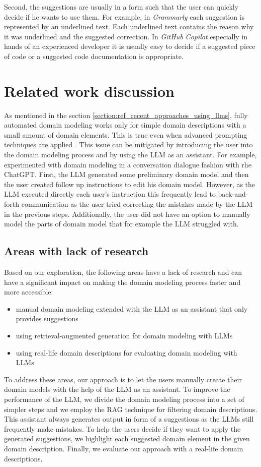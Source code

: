 Second, the suggestions are usually in a form such that the user can quickly decide if he wants to use them. For example, in \textit{Grammarly} each suggestion is represented by an underlined text. Each underlined text contains the reason why it was underlined and the suggested correction. In \textit{GitHub Copilot} especially in hands of an experienced developer it is usually easy to decide if a suggested piece of code or a suggested code documentation is appropriate.


\chapter{Related work discussion}

As mentioned in the section \ref{section:ref_recent_approaches_using_llms}, fully automated domain modeling works only for simple domain descriptions with a small amount of domain elements. This is true even when advanced prompting techniques are applied \cite{Saeedizade2024}. This issue can be mitigated by introducing the user into the domain modeling process \cite{Camara2023} and by using the LLM as an assistant. For example, \citet{Camara2023} experimented with domain modeling in a conversation dialogue fashion with rhe ChatGPT. First, the LLM generated some preliminary domain model and then the user created follow up instructions to edit his domain model. However, as the LLM executed directly each user's instruction this frequently lead to back-and-forth communication as the user tried correcting the mistakes made by the LLM in the previous steps. Additionally, the user did not have an option to manually model the parts of domain model that for example the LLM struggled with.


\section{Areas with lack of research}
Based on our exploration, the following areas have a lack of research and can have a significant impact on making the domain modeling process faster and more accessible:

\begin{itemize}
\item manual domain modeling extended with the LLM as an assistant that only provides suggestions
\item using retrieval-augmented generation for domain modeling with LLMs
\item using real-life domain descriptions for evaluating domain modeling with LLMs
\end{itemize}

To address these areas, our approach is to let the users manually create their domain models with the help of the LLM as an assistant. To improve the performance of the LLM, we divide the domain modeling process into a set of simpler steps and we employ the RAG technique for filtering domain descriptions. This assistant always generates output in form of a suggestions as the LLMs still frequently make mistakes. To help the users decide if they want to apply the generated suggestions, we highlight each suggested domain element in the given domain description. Finally, we evaluate our approach with a real-life domain descriptions.
